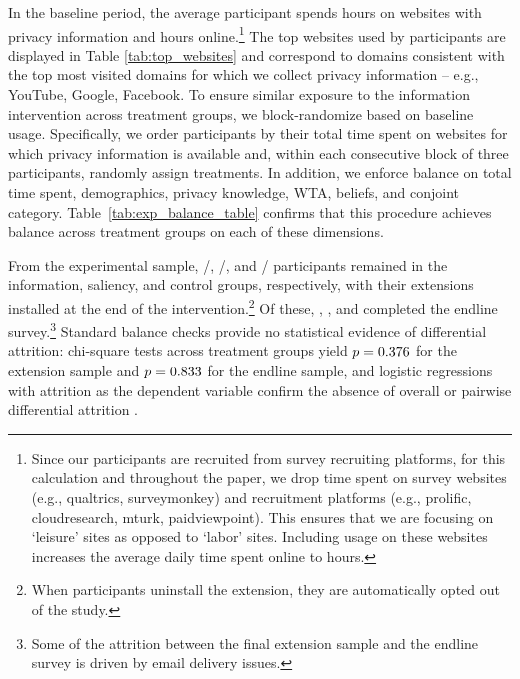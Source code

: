 \documentclass[12pt]{article}
\theoremstyle{definition}
\theoremstyle{remark}
\begin{document}
In the baseline period, the average participant spends \baselineDailyHoursPrivacy{} hours on websites with privacy information and \baselineDailyHoursLeisure{} hours online.\footnote{Since our participants are recruited from survey recruiting platforms, for this calculation and throughout the paper, we drop time spent on survey websites (e.g., qualtrics, surveymonkey) and recruitment platforms (e.g., prolific, cloudresearch, mturk, paidviewpoint). This ensures that we are focusing on `leisure' sites as opposed to `labor' sites. Including usage on these websites increases the average daily time spent online to \baselineDailyHoursAll{} hours.} The top websites used by participants are displayed in Table \ref{tab:top_websites} and correspond to domains consistent with the top most visited domains for which we collect privacy information -- e.g., YouTube, Google,  Facebook. To ensure similar exposure to the information intervention across treatment groups, we block-randomize based on baseline usage. Specifically, we order participants by their total time spent on websites for which privacy information is available and, within each consecutive block of three participants, randomly assign treatments. In addition, we enforce balance on total time spent, demographics, privacy knowledge, WTA, beliefs, and conjoint category. Table~\ref{tab:exp_balance_table} confirms that this procedure achieves balance across treatment groups on each of these dimensions.

From the experimental sample, \extensionInfoFinalN{}/\extensionInfoStartN{}, \extensionSaliencyFinalN{}/\extensionSaliencyStartN{}, and \extensionControlFinalN{}/\extensionControlStartN{} participants remained in the information, saliency, and control groups, respectively, with their extensions installed at the end of the intervention.\footnote{When participants uninstall the extension, they are automatically opted out of the study.} Of these, \surveyEndlineInfoN{}, \surveyEndlineSaliencyN{}, and \surveyEndlineControlN{} completed the endline survey.\footnote{Some of the attrition between the final extension sample and the endline survey is driven by email delivery issues.} Standard balance checks provide no statistical evidence of differential attrition: chi-square tests across treatment groups yield $p = 0.376{}$ for the extension sample and $p = 0.833{}$ for the endline sample, and logistic regressions with attrition as the dependent variable confirm the absence of overall or pairwise differential attrition \citep{gerber2012field}.
\end{document}
